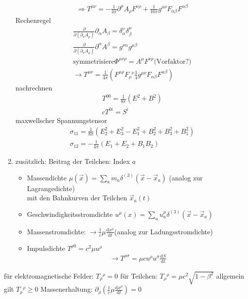 \documentclass[a4paper]{article}
\begin{document}
\begin{enumerate}
\begin{align}
  \Rightarrow T^{\mu\nu}=-\frac{1}{4\pi}\partial^\mu A_\rho
  F^{\nu\rho}+\frac{1}{16\pi} g^{\mu\nu} F_{\alpha\beta}F^{\alpha\beta}
  \end{align}
  Rechenregel \begin{align}
  \frac{\partial}{\partial(\partial_\nu A_\rho)}\partial_\alpha A_\beta
  =\delta^\nu_\alpha\delta^\mu_\beta\\
  \frac{\partial}{\partial(\partial_\nu A_\rho)}\partial^\alpha A^\beta
  =g^{\nu\alpha}g^{\mu\beta}\\
  \text{symmetrisiere} \Phi^{\mu\nu\rho}=A^\mu F^{\nu\rho} \text{
  (Vorfaktor?)}\\
  \rightarrow T^{\mu\nu}=\frac{1}{4\pi}\left(
  F^{\mu\rho}F_{\rho}{}^{\nu} \frac{1}{4} g^{\mu\nu}
  F_{\alpha\beta}F^{\alpha\beta}\right)
  \end{align}
  nachrechnen
  \begin{align}
  T^{00}=\frac{1}{8\pi}(E^2+B^2)\\
  cT^{0i}=S^i
  \end{align}
  maxwellscher Spannungstensor
  \begin{align}
  \sigma_{11}=\frac{1}{8\pi}\left( E_2^2+E_3^2-E_1^2+B^2_2+B^2_3+B^2_1 \right)\\
  \sigma_{12}=-\frac{1}{4\pi}\left( E_1+E_2+B_1B_2 \right)
  \end{align}
  \item zusätzlich: Beitrag der Teilchen: Index $a$\\
  \begin{itemize}
  \item Massendichte $\mu(\vec{x})=\sum_am_a\delta^{(3)}(\vec{x}-\vec{x}_a)$
  	(analog zur Lagrangedichte)\\
  	mit den Bahnkurven der Teilchen $\vec{x}_a(t)$\\
  \item Geschwindigkeitsstromdichte 
  	$u^\mu(x)=\sum_a u^\mu_a \delta^{(3)}(\vec{x}-\vec{x}_a)$
  \item Massenstromdichte: $\rightarrow \frac{1}{c}\mu\frac{\mathrm{d}x^\rho}{\mathrm{d}t}$(analog zur
  	Ladungsstromdichte)\\
  \item Impulsdichte $T^{\rho0}=c^2\mu u^\rho$\\ \begin{align}
  	\rightarrow T^{\rho\sigma}=\mu c u^\rho u^\sigma \frac{\mathrm{d}S}{\mathrm{d}t}
  	\end{align} 
  \end{itemize}
\end{enumerate}
für elektromagnetische Felder: $T_\rho{}^\rho=0$
für Teilchen: $T_\rho{}^\rho=\mu c^2\sqrt{1-\beta^2}$
allgemein gilt $T_\rho{}^\rho\geq0$
Massenerhaltung: $\partial_\rho\left( \frac{1}{c}\mu \frac{\mathrm{d}x^\rho}{\mathrm{d}t}
\right)=0$
\end{document}
